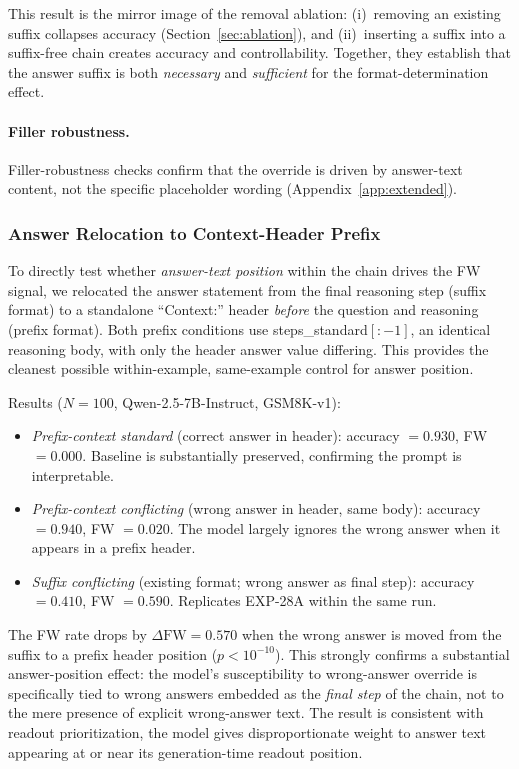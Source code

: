 \documentclass{article}
\theoremstyle{definition}
\theoremstyle{definition}
\newcommand{\PCTXN}{100}
\newcommand{\PCTXSTDACC}{0.930}
\newcommand{\PCTXSTDFW}{0.000}
\newcommand{\PCTXCACC}{0.940}
\newcommand{\PCTXCFW}{0.020}
\newcommand{\PCTXSUFFW}{0.590}
\newcommand{\PCTXSUFACC}{0.410}
\newcommand{\PCTXPOSPVAL}{$p{<}10^{-10}$}
\newcommand{\PCTXFWRED}{0.570}
\begin{document}
This result is the mirror image of the removal ablation:
(i)~removing an existing suffix collapses accuracy
(Section~\ref{sec:ablation}), and (ii)~inserting a suffix into
a suffix-free chain creates accuracy and controllability.
Together, they establish that the answer suffix is both \emph{necessary}
and \emph{sufficient} for the format-determination effect.

\paragraph{Filler robustness.}
Filler-robustness checks confirm that the override is driven by answer-text
content, not the specific placeholder wording (Appendix~\ref{app:extended}).

\subsubsection{Answer Relocation to Context-Header Prefix}
\label{sec:relocation}
To directly test whether \emph{answer-text position} within the chain drives the FW
signal, we relocated the answer statement from the final reasoning step (suffix format)
to a standalone ``Context:'' header \emph{before} the question and reasoning
(prefix format).
Both prefix conditions use steps\_standard$[:-1]$, an identical reasoning body, with
only the header answer value differing.
This provides the cleanest possible within-example, same-example control for answer
position.

\noindent
Results ($N{=}\PCTXN$, Qwen-2.5-7B-Instruct, GSM8K-v1):

\begin{itemize}[topsep=2pt,itemsep=1pt]
  \item \emph{Prefix-context standard} (correct answer in header):
        accuracy $=\PCTXSTDACC$, FW $=\PCTXSTDFW$.
        Baseline is substantially preserved, confirming the prompt is interpretable.
  \item \emph{Prefix-context conflicting} (wrong answer in header, same body):
        accuracy $=\PCTXCACC$, FW $=\PCTXCFW$.
        The model largely ignores the wrong answer when it appears in a prefix header.
  \item \emph{Suffix conflicting} (existing format; wrong answer as final step):
        accuracy $=\PCTXSUFACC$, FW $=\PCTXSUFFW$.
        Replicates EXP-28A within the same run.
\end{itemize}

\noindent
The FW rate drops by $\Delta{\mathrm{FW}}=\PCTXFWRED$ when the wrong answer is moved
from the suffix to a prefix header position (\PCTXPOSPVAL).
This strongly confirms a substantial answer-position effect:
the model's susceptibility to wrong-answer override is specifically tied to wrong
answers embedded as the \emph{final step} of the chain, not to the mere presence of
explicit wrong-answer text.
The result is consistent with readout prioritization, the model gives disproportionate
weight to answer text appearing at or near its generation-time readout position.
\end{document}
